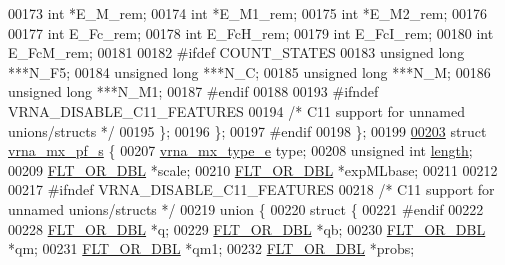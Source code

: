 \begin{DoxyCode}
00173       \textcolor{keywordtype}{int}             *E\_M\_rem;
00174       \textcolor{keywordtype}{int}             *E\_M1\_rem;
00175       \textcolor{keywordtype}{int}             *E\_M2\_rem;
00176 
00177       \textcolor{keywordtype}{int}             E\_Fc\_rem;
00178       \textcolor{keywordtype}{int}             E\_FcH\_rem;
00179       \textcolor{keywordtype}{int}             E\_FcI\_rem;
00180       \textcolor{keywordtype}{int}             E\_FcM\_rem;
00181 
00182 \textcolor{preprocessor}{#ifdef COUNT\_STATES}
00183       \textcolor{keywordtype}{unsigned} \textcolor{keywordtype}{long}   ***N\_F5;
00184       \textcolor{keywordtype}{unsigned} \textcolor{keywordtype}{long}   ***N\_C;
00185       \textcolor{keywordtype}{unsigned} \textcolor{keywordtype}{long}   ***N\_M;
00186       \textcolor{keywordtype}{unsigned} \textcolor{keywordtype}{long}   ***N\_M1;
00187 \textcolor{preprocessor}{#endif}
00188 
00193 \textcolor{preprocessor}{#ifndef VRNA\_DISABLE\_C11\_FEATURES}
00194     \textcolor{comment}{/* C11 support for unnamed unions/structs */}
00195     \};
00196   \};
00197 \textcolor{preprocessor}{#endif}
00198 \};
00199 
\hypertarget{dp__matrices_8h_source.tex_l00203}{}\hyperlink{group__dp__matrices}{00203} \textcolor{keyword}{struct }\hyperlink{group__dp__matrices_structvrna__mx__pf__s}{vrna\_mx\_pf\_s} \{
00207   \hyperlink{group__dp__matrices_ga6042ea1d58d01931e959791be6d89343}{vrna\_mx\_type\_e}  type;
00208   \textcolor{keywordtype}{unsigned} \textcolor{keywordtype}{int}    \hyperlink{group__dp__matrices_a1f92a8406fc1fb721dbf9193c34ad826}{length};
00209   \hyperlink{group__data__structures_ga31125aeace516926bf7f251f759b6126}{FLT\_OR\_DBL}      *scale;
00210   \hyperlink{group__data__structures_ga31125aeace516926bf7f251f759b6126}{FLT\_OR\_DBL}      *expMLbase;
00211 
00212 
00217 \textcolor{preprocessor}{#ifndef VRNA\_DISABLE\_C11\_FEATURES}
00218     \textcolor{comment}{/* C11 support for unnamed unions/structs */}
00219   \textcolor{keyword}{union }\{
00220     \textcolor{keyword}{struct }\{
00221 \textcolor{preprocessor}{#endif}
00222 
00228       \hyperlink{group__data__structures_ga31125aeace516926bf7f251f759b6126}{FLT\_OR\_DBL}  *q;
00229       \hyperlink{group__data__structures_ga31125aeace516926bf7f251f759b6126}{FLT\_OR\_DBL}  *qb;
00230       \hyperlink{group__data__structures_ga31125aeace516926bf7f251f759b6126}{FLT\_OR\_DBL}  *qm;
00231       \hyperlink{group__data__structures_ga31125aeace516926bf7f251f759b6126}{FLT\_OR\_DBL}  *qm1;
00232       \hyperlink{group__data__structures_ga31125aeace516926bf7f251f759b6126}{FLT\_OR\_DBL}  *probs;

\end{DoxyCode}
